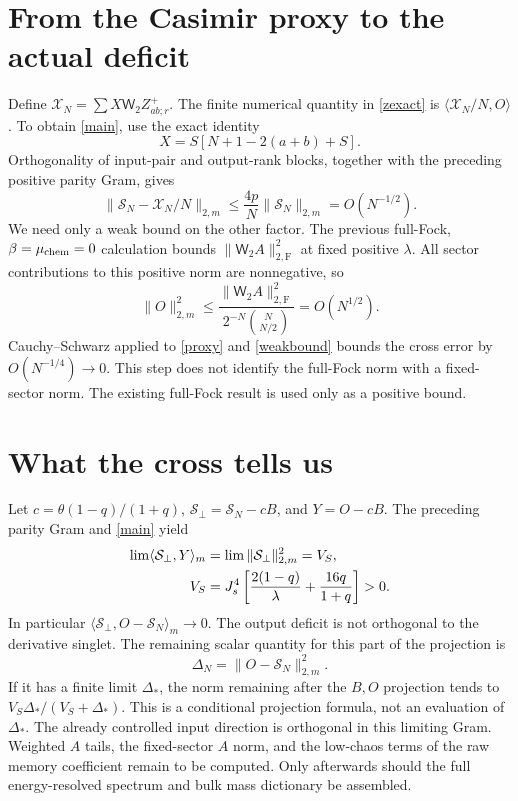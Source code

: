 \documentclass[11pt,a4paper]{article}
\newcommand{\W}{\mathsf W_2}
\begin{document}
\newpage
\section{From the Casimir proxy to the actual deficit}
Define $\mathcal X_N=\sum X\W Z^+_{ab;r}$. The finite numerical
quantity in \eqref{zexact} is $\langle\mathcal X_N/N,O\rangle$.
To obtain \eqref{main}, use the exact identity
\begin{equation}
 X=S[N+1-2(a+b)+S].
\end{equation}
Orthogonality of input-pair and output-rank blocks, together with
the preceding positive parity Gram, gives
\begin{equation}
 \|\mathcal S_N-\mathcal X_N/N\|_{2,m}
 \leq\frac{4p}{N}\|\mathcal S_N\|_{2,m}=O(N^{-1/2}).\label{proxy}
\end{equation}
We need only a weak bound on the other factor. The previous
full-Fock, $\beta=\mu_{\rm chem}=0$ calculation bounds
$\|\W A\|_{2,\mathrm F}^2$ at fixed positive $\lambda$.
All sector contributions to this positive norm are nonnegative, so
\begin{equation}
 \|O\|_{2,m}^2\leq
 \frac{\|\W A\|_{2,\mathrm F}^2}{2^{-N}\binom N{N/2}}
 =O(N^{1/2}).\label{weakbound}
\end{equation}
Cauchy--Schwarz applied to \eqref{proxy} and \eqref{weakbound}
bounds the cross error by $O(N^{-1/4})\to0$.
This step does not identify the full-Fock norm with a fixed-sector
norm. The existing full-Fock result is used only as a positive bound.

\section{What the cross tells us}
Let $c=\theta(1-q)/(1+q)$, $\mathcal S_\perp=\mathcal S_N-cB$,
and $Y=O-cB$. The preceding parity Gram and \eqref{main} yield
\begin{align}
 \lim\langle\mathcal S_\perp,Y\rangle_m
 &=\lim\|\mathcal S_\perp\|_{2,m}^2=V_S,\notag\\
 V_S&=J_s^4\left[\frac{2(1-q)}\lambda+
                         \frac{16q}{1+q}\right]>0.\label{VS}
\end{align}
In particular $\langle\mathcal S_\perp,O-\mathcal S_N\rangle_m\to0$.
The output deficit is not orthogonal to the derivative singlet.
The remaining scalar quantity for this part of the projection is
\begin{equation}
 \Delta_N=\|O-\mathcal S_N\|_{2,m}^2.
\end{equation}
If it has a finite limit $\Delta_*$, the norm remaining after the
$B,O$ projection tends to $V_S\Delta_* /(V_S+\Delta_*)$.
This is a conditional projection formula, not an evaluation of
$\Delta_*$. The already controlled input direction is orthogonal
in this limiting Gram. Weighted $A$ tails, the fixed-sector $A$ norm,
and the low-chaos terms of the raw memory coefficient remain to be
computed. Only afterwards should the full energy-resolved spectrum
and bulk mass dictionary be assembled.
\end{document}
